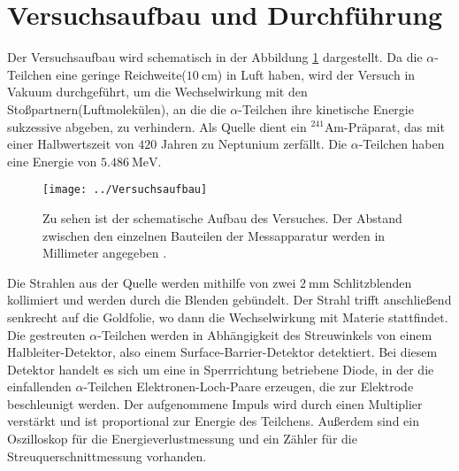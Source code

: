 \section{Versuchsaufbau und Durchführung}
\label{sec:Durchführung}
Der Versuchsaufbau wird schematisch in der Abbildung \ref{fig:versuchsaufbau} dargestellt. Da die $\alpha$-Teilchen eine geringe Reichweite($\SI{10}{\centi\meter}$) in Luft haben, wird der Versuch in Vakuum durchgeführt, um die Wechselwirkung mit den Stoßpartnern(Luftmolekülen), an die die $\alpha$-Teilchen ihre kinetische Energie sukzessive abgeben, zu verhindern. Als Quelle dient ein $^{241}$Am-Präparat, das mit einer Halbwertszeit von $420$ Jahren zu Neptunium zerfällt. Die $\alpha$-Teilchen haben eine Energie von $\SI{5,486}{\mega\electronvolt}$.

\begin{figure}[h!]
	\centering
	\texttt{[image: ../Versuchsaufbau]}
	\caption{Zu sehen ist der schematische Aufbau des Versuches. Der Abstand zwischen den einzelnen Bauteilen der Messapparatur werden in Millimeter angegeben \cite[2]{anleitungV16}.}
	\label{fig:versuchsaufbau}
\end{figure}

Die Strahlen aus der Quelle werden mithilfe von zwei $\SI{2}{\milli\meter}$ Schlitzblenden kollimiert und werden durch die Blenden gebündelt. Der Strahl trifft anschließend senkrecht auf die Goldfolie, wo dann die Wechselwirkung mit Materie stattfindet. Die gestreuten $\alpha$-Teilchen werden in Abhängigkeit des Streuwinkels von einem Halbleiter-Detektor, also einem Surface-Barrier-Detektor detektiert. Bei diesem Detektor handelt es sich um eine in Sperrrichtung betriebene Diode, in der die einfallenden $\alpha$-Teilchen Elektronen-Loch-Paare erzeugen, die zur Elektrode beschleunigt werden. Der aufgenommene Impuls wird durch einen Multiplier verstärkt und ist proportional zur Energie des Teilchens. Außerdem sind ein Oszilloskop für die Energieverlustmessung und ein Zähler für die Streuquerschnittmessung vorhanden.


